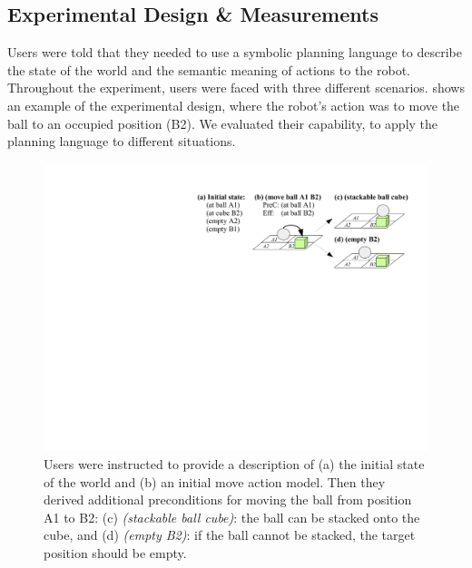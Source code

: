 \subsection{Experimental Design \& Measurements}
Users were told that they needed to use a symbolic planning language to describe the state of the world and the semantic meaning of actions to the robot. 
Throughout the experiment, users were faced with three different scenarios. 
 shows an example of the experimental design, where the robot's action was to move the ball to an occupied position (B2). 
We evaluated their capability, to apply the planning language to different situations.

\begin{figure}[h]
	\centering
	\includegraphics[width=0.75\linewidth]{figures/scenarios-exp1}
	\caption{Users were instructed to provide a description of (a) the initial state of the world and (b) an initial move action model.
		Then they derived additional preconditions for moving the ball from position A1 to B2: (c) \textit{(stackable ball cube)}: the ball can be stacked onto the cube, and (d) \textit{(empty B2)}: if the ball cannot be stacked, the target position should be empty.}
	\label{fig:scenarios-exp1}
\end{figure}

